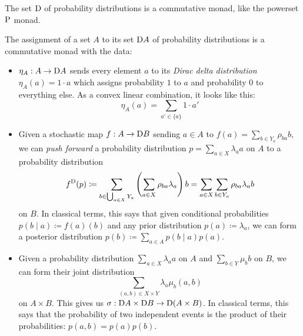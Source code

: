 \documentclass[DynamicalBook]{subfiles}
\begin{document}
The set $\mathrm{D}$ of probability distributions is a commutative monad, like the
powerset $\mathrm{P}$ monad.
\begin{proposition}\label{prop.prob_monad}
  The assignment of a set $A$ to its set $\mathrm{D} A$ of probability
  distributions is a commutative monad with the data:
  \begin{itemize}
    \item $\eta_A : A \to \mathrm{D} A$ sends every element $a$ to its \emph{Dirac
      delta distribution} $\eta_{A}(a) = 1 \cdot a$ which assigns probability
    $1$ to $a$ and probability $0$ to everything else. As a convex linear
    combination, it looks like this:
    \[
\eta_A(a) = \sum_{a' \in \{a\}} 1 \cdot a'
    \]
    \item Given a stochastic map $f : A \to \mathrm{D} B$ sending $a \in A$ to $f(a)
      = \sum_{b \in Y_a} \rho_{ba} b$, we can \emph{push
        forward} a probability distribution $p = \sum_{a \in X} \lambda_a a$ on
      $A$ to a probability distribution 
      \[
f^{\mathrm{D}}(p) \coloneqq \sum_{b \in \bigcup_{a \in X} Y_a} \left(  \sum_{a \in
    X}\rho_{ba} \lambda_a \right) b = \sum_{a \in X} \sum_{b \in Y_a} \rho_{ba}
\lambda_a b
      \]
      on $B$. In classical terms, this says that given conditional probabilities
      $p(b \mid a) \coloneqq f(a)(b)$ and any prior distribution $p(a) \coloneqq
      \lambda_a$, we can
      form a posterior distribution
      $p(b) \coloneqq \sum_{a\in A} p(b \mid a) p(a).$
   \item  Given a probability distribution $\sum_{a \in X} \lambda_a a$ on $A$
     and $\sum_{b \in Y} \mu_b b$ on $B$, we can form their joint distribution
     \[
\sum_{(a, b) \in X \times Y} \lambda_a \mu_b (a, b)
\]
on $A \times B$. This gives us $\sigma : \mathrm{D} A \times \mathrm{D} B \to
\mathrm{D} (A \times B)$. In classical terms, this says that the probability of
two independent events is the product of their probabilities: $p(a, b) = p(a)p(b)$.
  \end{itemize}
\end{proposition}
\end{document}
